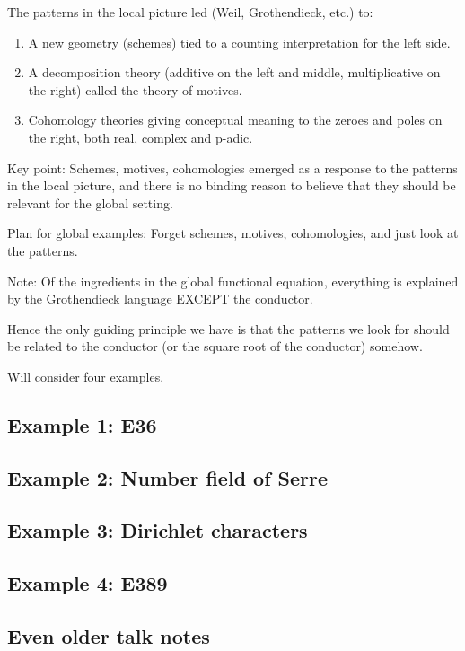 \documentclass[paper=a4, fontsize=11pt]{scrartcl} %
\numberwithin{equation}{section} %
\numberwithin{figure}{section} %
\numberwithin{table}{section} %
\begin{document}
The patterns in the local picture led (Weil, Grothendieck, etc.) to:

\begin{enumerate}
\item A new geometry (schemes) tied to a counting interpretation for the left side.
\item A decomposition theory (additive on the left and middle, multiplicative on the right) called the theory of motives.
\item Cohomology theories giving conceptual meaning to the zeroes and poles on the right, both real, complex and p-adic.
\end{enumerate}

Key point: Schemes, motives, cohomologies emerged as a response to the patterns in the local picture, and there is no binding reason to believe that they should be relevant for the global setting.

Plan for global examples: Forget schemes, motives, cohomologies, and just look at the patterns.

Note: Of the ingredients in the global functional equation, everything is explained by the Grothendieck language EXCEPT the conductor.

Hence the only guiding principle we have is that the patterns we look for should be related to the conductor (or the square root of the conductor) somehow.

Will consider four examples.

\subsection{Example 1: E36}


\subsection{Example 2: Number field of Serre}


\subsection{Example 3: Dirichlet characters}


\subsection{Example 4: E389}

\subsection{Even older talk notes}
\end{document}
